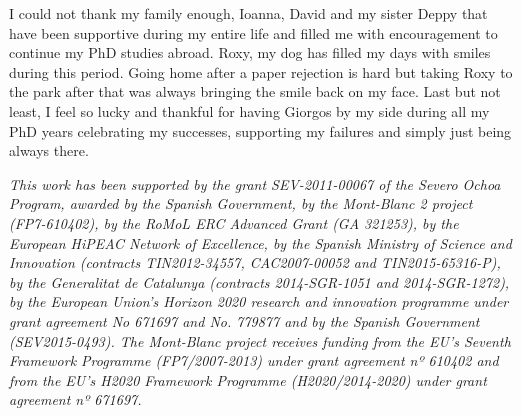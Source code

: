 \begin{acknowledgements}
I could not thank my family enough, Ioanna, David and my sister Deppy that have been supportive during my entire life and filled me with encouragement to continue my PhD studies abroad. 
Roxy, my dog has filled my days with smiles during this period. 
Going home after a paper rejection is hard but taking Roxy to the park after that was always bringing the smile back on my face.
Last but not least, I feel so lucky and thankful for having Giorgos by my side during all my PhD years celebrating my successes, supporting my failures and simply just being always there.




\textit{This work has been supported by the grant SEV-2011-00067 of the Severo Ochoa Program, awarded by the Spanish Government, 
by the Mont-Blanc 2 project (FP7-610402), 
by the RoMoL ERC Advanced Grant (GA 321253), 
by the European HiPEAC Network of Excellence, 
by the Spanish Ministry of Science and Innovation (contracts TIN2012-34557, CAC2007-00052 and TIN2015-65316-P), 
by the Generalitat de Catalunya (contracts 2014-SGR-1051 and 2014-SGR-1272), 
by the European Union's Horizon 2020 research and innovation programme under grant agreement No 671697 and No. 779877 and by the Spanish Government (SEV2015-0493).
The Mont-Blanc project receives funding from the EU’s Seventh Framework Programme (FP7/2007-2013) under grant agreement nº 610402 and from the EU’s H2020 Framework Programme (H2020/2014-2020) under grant agreement nº 671697.}
\end{acknowledgements}